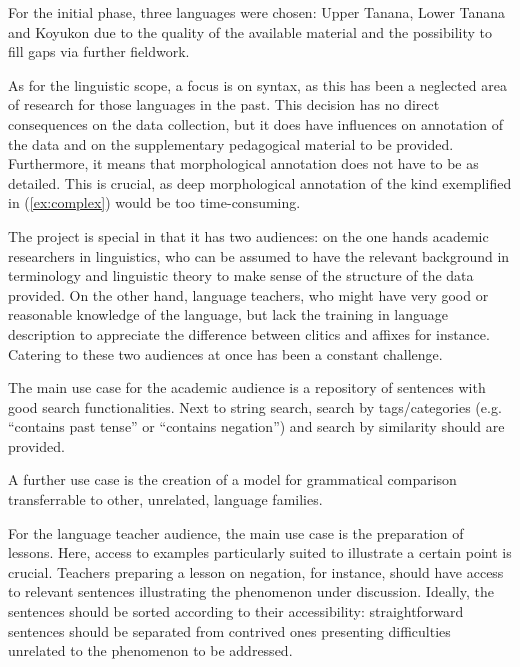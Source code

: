\documentclass[10pt, a4paper]{article}
\begin{document}
For the initial phase, three languages were chosen: Upper Tanana, Lower Tanana and Koyukon due to the quality of the available material and the possibility to fill gaps via further fieldwork.

As for the linguistic scope, a focus is on syntax, as this has been a neglected area of research for those languages in the past. This decision has no direct consequences on the data collection, but it does have influences on annotation of the data and on the supplementary pedagogical material to be provided. Furthermore, it means that morphological annotation does not have to be as detailed. This is crucial, as deep morphological annotation of the kind exemplified in (\ref{ex:complex}) would be too time-consuming.

The project is special in that it has two audiences: on the one hands academic researchers in linguistics, who can be assumed to have the relevant background in terminology and linguistic theory to make sense of the structure of the data provided. On the other hand, language teachers, who might have very good or reasonable knowledge of the language, but lack the training in language description to appreciate the difference between clitics and affixes for instance. Catering to these two audiences at once has been a constant challenge.

The main use case for the academic audience is a repository of sentences with good search functionalities. Next to string search, search by tags/ca\-te\-gories (e.g. ``contains past tense'' or ``contains negation'') and search by similarity should are provided. 

A further use case  is the creation of a model for grammatical comparison transferrable to other, unrelated, language families. 




For the language teacher audience, the main use case is the preparation of lessons. Here, access to examples particularly suited to illustrate a certain point is crucial. Teachers preparing a lesson on negation, for instance, should have access to relevant sentences illustrating the phenomenon under discussion. Ideally, the sentences should be sorted according to their accessibility: straightforward sentences should be separated from contrived ones presenting difficulties unrelated to the phenomenon to be addressed. 



\end{document}
